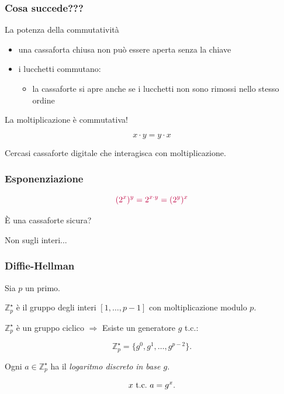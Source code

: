 \documentclass[]{beamer}
\begin{document}
\begin{frame}
\frametitle{Cosa succede???}

\begin{block}{La potenza della commutativit\`a}
\begin{itemize}
\item una cassaforta chiusa non pu\`o essere aperta senza la chiave
\item i lucchetti commutano:
    \begin{itemize}
    \item la cassaforte si apre anche se i lucchetti non sono rimossi nello
        stesso ordine
    \end{itemize}
\end{itemize}
\end{block}

\pause

\vfill

La moltiplicazione \`e commutativa!

$$x\cdot y=y\cdot x$$

\pause

\vfill
\begin{center}
{\color{magenta}
Cercasi cassaforte digitale che interagisca con moltiplicazione.
}
\end{center}

\end{frame}


\begin{frame}
\frametitle{Esponenziazione}
$$
\color{purple} (2^{x})^y=2^{x\cdot y}=(2^{y})^x$$

\pause

{\color{red} \`E una cassaforte sicura?
}

\pause

\vskip 1cm

\color{blue}
Non sugli interi...
\end{frame}

\begin{frame}
\frametitle{Diffie-Hellman }

Sia $p$ un primo.

\pause
\vskip 1cm
$\mathbb{Z}_p^\star$ \`e il gruppo degli interi $[1,\ldots,p-1]$
con moltiplicazione modulo $p$.

\pause
\vskip 1cm
$\mathbb{Z}_p^\star$ \`e un gruppo ciclico
\pause $\Rightarrow$
Esiste un \alert{generatore} $g$ t.c.:

$$\mathbb{Z}_p^\star=\{g^0,g^1,\ldots,g^{p-2}\}.$$

\pause

Ogni $a\in\mathbb{Z}_p^\star$ ha il \alert{\em logaritmo discreto}
\alert{\em in base $g$}.

$$x\ \text{\rm t.c.}\ a=g^x.$$

\end{frame}
\end{document}
